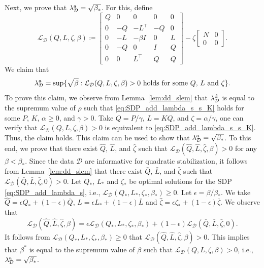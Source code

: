\documentclass[9pt,shortpaper,twoside,web]{ieeecolor}
\begin{document}
Next, we prove that $\lambda_{\mathcal{D}}^\textup{a}=\sqrt{\beta_*}$. For this, define
 \begin{equation}
    \label{eq:SDP_add_lambda_s_s}
        \mathcal{L}_{\mathcal{D}}(Q,L,\zeta,\beta)\coloneqq\begin{bmatrix}
            Q & 0 & 0 & 0 & 0\\
            0 & -Q & -L^\top & -Q & 0\\
            0 & -L & -\beta I & 0 & L\\
            0 & -Q & 0 & I & Q\\
            0 & 0 & L^\top & Q & Q 
        \end{bmatrix}-\zeta\begin{bmatrix}
            N & 0 \\ 0 & 0
        \end{bmatrix}.
\end{equation}
We claim that
\begin{equation}
\label{eq:clia_dd}
    \lambda_{\mathcal{D}}^\textup{a}=\sup \{\sqrt{\beta}: \mathcal{L}_{\mathcal{D}}(Q,L,\zeta,\beta)>0 \text{ holds for some $Q$, $L$ and $\zeta$}\}.
\end{equation}
To prove this claim, we observe from Lemma~\ref{lem:dd_slem} that $\lambda_\mathcal{D}^\textup{d}$ is equal to the supremum value of $\rho$ such that \eqref{eq:SDP_add_lambda_s_s_K} holds for some $P$, $K$, $\alpha\geq 0$, and $\gamma > 0$. Take $Q=P/\gamma$, $L=KQ$, and $\zeta=\alpha/\gamma$, one can verify that $\mathcal{L}_{\mathcal{D}}(Q,L,\zeta,\beta)> 0$ is equivalent to \eqref{eq:SDP_add_lambda_s_s_K}. Thus, the claim holds. This claim can be used to show that $\lambda_{\mathcal{D}}^\textup{a}=\sqrt{\beta_*}$. To this end, we prove that there exist $\hat Q$, $\hat L$, and $\hat \zeta$ such that \mbox{$\mathcal{L}_{\mathcal{D}}(\hat Q,\hat L,\hat \zeta,\beta)>0$} for any $\beta < \beta_*$. Since the data $\mathcal{D}$ are informative for quadratic stabilization, it follows from Lemma~\ref{lem:dd_slem} that there exist $\bar Q$, $\bar L$, and $\bar \zeta$ such that $\mathcal{L}_{\mathcal{D}}(\bar Q,\bar L,\bar \zeta,0)>0$. Let $Q_*$, $L_*$ and $\zeta_*$ be optimal solutions for the SDP \eqref{eq:SDP_add_lambda_s}, i.e., $\mathcal{L}_{\mathcal{D}}(Q_*,L_*,\zeta_*,\beta_*)\geq 0$. Let \mbox{$\epsilon=\beta/\beta_*$}. We take $\hat Q=\epsilon Q_*+(1-\epsilon)\bar Q$, $\hat L=\epsilon L_*+(1-\epsilon)\bar L$ and $\hat \zeta=\epsilon \zeta_*+(1-\epsilon)\bar \zeta$. We observe that
$$
\mathcal{L}_{\mathcal{D}}(\hat Q,\hat L,\hat \zeta,\beta)=\epsilon \mathcal{L}_{\mathcal{D}}(Q_*,L_*,\zeta_*,\beta_*)+(1-\epsilon)\mathcal{L}_{\mathcal{D}}(\bar Q,\bar L,\bar \zeta,0).
$$
It follows from $\mathcal{L}_{\mathcal{D}}(Q_*,L_*,\zeta_*,\beta_*)\geq0$ that $\mathcal{L}_{\mathcal{D}}(\hat Q,\hat L,\hat \zeta,\beta)>0$. This implies that $\beta^*$ is equal to the supremum value of $\beta$ such that $\mathcal{L}_{\mathcal{D}}(Q,L,\zeta,\beta)>0$, i.e., $\lambda_{\mathcal{D}}^\textup{a}=\sqrt{\beta_*}$.
\end{document}
